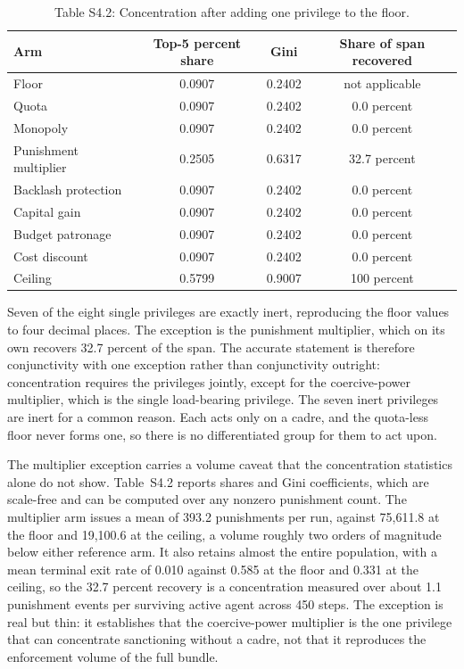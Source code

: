 \documentclass[12pt]{article}
\begin{document}
\begin{table}[htbp]
\centering
\small
\caption{Table S4.2: Concentration after adding one privilege to the floor.}
\begin{tabular}{lccc}
\toprule
Arm & Top-5 percent share & Gini & Share of span recovered \\
\midrule
Floor & 0.0907 & 0.2402 & not applicable \\
Quota & 0.0907 & 0.2402 & 0.0 percent \\
Monopoly & 0.0907 & 0.2402 & 0.0 percent \\
Punishment multiplier & 0.2505 & 0.6317 & 32.7 percent \\
Backlash protection & 0.0907 & 0.2402 & 0.0 percent \\
Capital gain & 0.0907 & 0.2402 & 0.0 percent \\
Budget patronage & 0.0907 & 0.2402 & 0.0 percent \\
Cost discount & 0.0907 & 0.2402 & 0.0 percent \\
Ceiling & 0.5799 & 0.9007 & 100 percent \\
\bottomrule
\end{tabular}
\end{table}

Seven of the eight single privileges are exactly inert, reproducing the floor
values to four decimal places. The exception is the punishment multiplier, which
on its own recovers 32.7 percent of the span. The accurate statement is
therefore conjunctivity with one exception rather than conjunctivity outright:
concentration requires the privileges jointly, except for the coercive-power
multiplier, which is the single load-bearing privilege. The seven inert
privileges are inert for a common reason. Each acts only on a cadre, and the
quota-less floor never forms one, so there is no differentiated group for them
to act upon.

The multiplier exception carries a volume caveat that the concentration
statistics alone do not show. Table~S4.2 reports shares and Gini coefficients,
which are scale-free and can be computed over any nonzero punishment count. The
multiplier arm issues a mean of 393.2 punishments per run, against 75{,}611.8 at
the floor and 19{,}100.6 at the ceiling, a volume roughly two orders of
magnitude below either reference arm. It also retains almost the entire
population, with a mean terminal exit rate of 0.010 against 0.585 at the floor
and 0.331 at the ceiling, so the 32.7 percent recovery is a concentration
measured over about 1.1 punishment events per surviving active agent across 450
steps. The exception is real but thin: it establishes that the coercive-power
multiplier is the one privilege that can concentrate sanctioning without a
cadre, not that it reproduces the enforcement volume of the full bundle.
\end{document}
